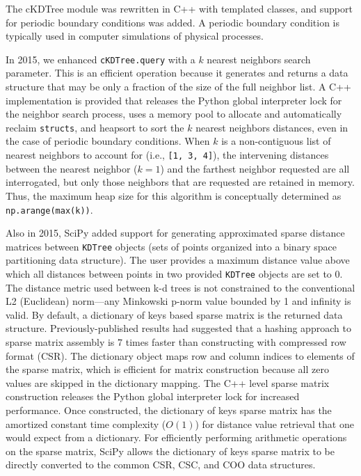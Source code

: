 
The cKDTree module was rewritten in C++ with templated classes, and support for
periodic boundary conditions was added. A periodic boundary condition is typically 
used in computer simulations of physical processes.

In 2015, we enhanced \texttt{cKDTree.query} with a $k$ nearest neighbors search
parameter. This is an efficient operation\cite{Sproull:1991:RNS:3118219.3118331} 
because it generates and returns a data structure that may be only a fraction 
of the size of the full neighbor list. A C++ implementation is provided that releases
the Python global interpreter lock for the neighbor search process, uses
a memory pool to allocate and automatically reclaim \texttt{structs}, and
heapsort to sort the $k$ nearest neighbors distances, even in the case
of periodic boundary conditions. When $k$ is a non-contiguous list of nearest
neighbors to account for (i.e., \texttt{[1, 3, 4]}), the intervening distances
between the nearest neighbor ($k = 1$) and the farthest neighbor requested
are all interrogated, but only those neighbors that are requested are retained
in memory. Thus, the maximum heap size for this algorithm is conceptually determined
as \texttt{np.arange(max(k))}.

Also in 2015, SciPy added support for generating approximated sparse distance matrices 
between \texttt{KDTree} objects (sets of points organized into a binary space 
partitioning data structure\cite{Bentley:1975:MBS:361002.361007}). 
The user provides a maximum distance value
above which all distances between points in two provided \texttt{KDTree} objects
are set to 0. The distance metric used between k-d trees is not constrained
to the conventional L2 (Euclidean) norm---any Minkowski p-norm value
bounded by 1 and infinity is valid. By default, a dictionary of keys
based sparse matrix is the returned data structure. Previously-published
results had suggested that a hashing approach to sparse matrix assembly
is 7 times faster than constructing with compressed row format (CSR)\cite{10.1007/978-3-540-75755-9_107}.
The dictionary object maps row and column indices to elements of the sparse matrix, which is
efficient for matrix construction because all zero values are skipped in
the dictionary mapping. The C++ level sparse matrix construction releases the Python
global interpreter lock for increased performance. Once constructed, the
dictionary of keys sparse matrix has the amortized constant time complexity 
($O(1)$) for distance value retrieval that one would expect from a 
dictionary\cite{Cormen:2001:IA:580470}. For efficiently performing arithmetic
operations on the sparse matrix, SciPy allows the dictionary of keys
sparse matrix to be directly converted to the common CSR, CSC, and COO
data structures.

